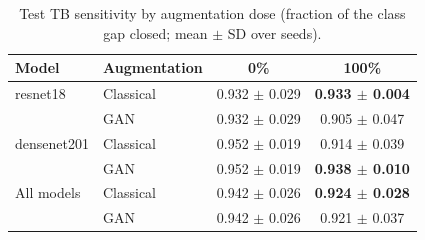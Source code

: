 \begin{table}[htbp]
\centering
\caption{Test TB sensitivity by augmentation dose (fraction of the class gap closed; mean $\pm$ SD over seeds).}
\label{tab:dose_tb_recall}
\begin{tabular}{llcc}
\toprule
Model & Augmentation & 0\% & 100\% \\
\midrule
resnet18 & Classical & 0.932 $\pm$ 0.029 & \textbf{0.933 $\pm$ 0.004} \\
 & GAN & 0.932 $\pm$ 0.029 & 0.905 $\pm$ 0.047 \\
\addlinespace
densenet201 & Classical & 0.952 $\pm$ 0.019 & 0.914 $\pm$ 0.039 \\
 & GAN & 0.952 $\pm$ 0.019 & \textbf{0.938 $\pm$ 0.010} \\
\addlinespace
All models & Classical & 0.942 $\pm$ 0.026 & \textbf{0.924 $\pm$ 0.028} \\
 & GAN & 0.942 $\pm$ 0.026 & 0.921 $\pm$ 0.037 \\
\bottomrule
\end{tabular}
\end{table}